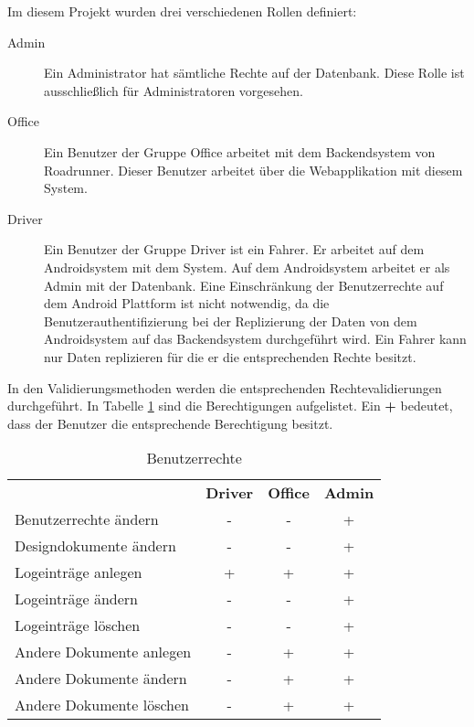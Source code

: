 \noindent Im diesem Projekt wurden drei verschiedenen Rollen definiert:

\begin{description}
	\item[Admin] Ein Administrator hat sämtliche Rechte auf der Datenbank. Diese
		Rolle ist ausschließlich für Administratoren vorgesehen.
	\item[Office] Ein Benutzer der Gruppe Office arbeitet mit dem Backendsystem von
		Roadrunner. Dieser Benutzer arbeitet über die Webapplikation mit diesem System.
	\item[Driver] Ein Benutzer der Gruppe Driver ist ein Fahrer. Er arbeitet auf dem
		Androidsystem mit dem System. Auf dem Androidsystem arbeitet er als Admin mit
		der Datenbank. Eine Einschränkung der Benutzerrechte auf dem Android Plattform 
		ist nicht notwendig, da die Benutzerauthentifizierung bei der Replizierung der
		Daten von dem Androidsystem auf das Backendsystem durchgeführt wird. Ein Fahrer
		kann nur Daten replizieren für die er die entsprechenden Rechte besitzt.
\end{description}

\noindent In den Validierungsmethoden werden die entsprechenden Rechtevalidierungen
	durchgeführt. In Tabelle \ref{tab:rechte} sind die Berechtigungen aufgelistet.
	Ein \textbf{+} bedeutet, dass der Benutzer die entsprechende Berechtigung besitzt.

\begin{table}[h]
	\begin{tabular}{lccc}
		& \textbf{Driver} & \textbf{Office} & \textbf{Admin} \\
		Benutzerrechte ändern & - & - & + \\
		Designdokumente ändern & - & - & + \\
		Logeinträge anlegen & + & + & + \\
		Logeinträge ändern & - & - & + \\
		Logeinträge löschen & - & - & + \\
		Andere Dokumente anlegen & - & + & + \\
		Andere Dokumente ändern & - & + & + \\
		Andere Dokumente löschen & - & + & +
	\end{tabular}
	\caption{Benutzerrechte}
	\label{tab:rechte}
\end{table}
